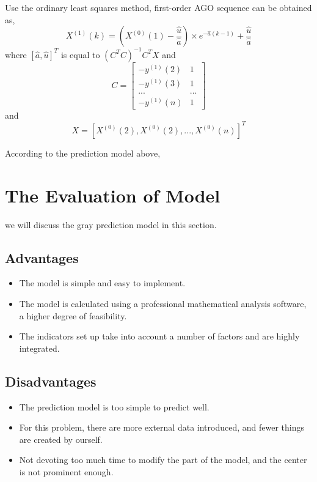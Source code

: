 \documentclass{mcmthesis}
\begin{document}
Use the ordinary least squares method, first-order AGO sequence can be obtained as,
\begin{equation}
  X^{(1)}(k)=\left(X^{(0)}(1)-\frac{\hat{u}}{\hat{a}}\right)\times e^{-\hat{a}(k-1)}+\frac{\hat{u}}{\hat{a}}
\end{equation}
where $\left[\hat{a},\hat{u}\right]^T$ is equal to $\left(C^TC\right)^{-1}C^TX$
and
\begin{equation}
C=\begin{bmatrix}-y^{(1)}(2)&1\\-y^{(1)}(3)&1\\...&...\\-y^{(1)}(n)&1\end{bmatrix}
\end{equation}
and
\begin{equation}
  X = \left[X^{(0)}(2),X^{(0)}(2),...,X^{(0)}(n)\right]^T
\end{equation}

According to the prediction model above, 


\section{The Evaluation of Model}

we will discuss the gray prediction model in this section.
\subsection{Advantages}
\begin{itemize}
  \item The model is simple and easy to implement.
  \item The model is calculated using a professional mathematical analysis software, a higher degree of feasibility.
  \item The indicators set up take into account a number of factors and are highly integrated.
\end{itemize}
\subsection{Disadvantages}
\begin{itemize}
  \item The prediction model is too simple to predict well.
  \item For this problem, there are more external data introduced, and fewer things are created by ourself.
  \item Not devoting too much time to modify the part of the model, and the center is not prominent enough.
\end{itemize}
\end{document}
